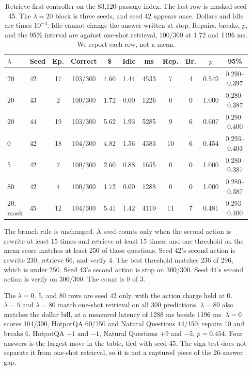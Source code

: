 \documentclass[letterpaper]{article} %
\begin{document}
\begin{table}[t]
\centering
\small
\setlength{\tabcolsep}{4pt}
\begin{tabular}{@{}llccccccccc@{}}
\toprule
\(\lambda\) & Seed & Ep. & Correct & \$ & Idle & ms & Rep. & Br. & \(p\) & 95\% \\
\midrule
20 & 42 & 17 & 103/300 & 4.60 & 1.44 & 4533 & 7 & 4 & 0.549 & 0.290--0.397 \\
20 & 43 & 2 & 100/300 & 1.72 & 0.00 & 1226 & 0 & 0 & 1.000 & 0.280--0.387 \\
20 & 44 & 19 & 103/300 & 5.62 & 1.93 & 5285 & 9 & 6 & 0.607 & 0.290--0.400 \\
0 & 42 & 18 & 104/300 & 4.82 & 1.56 & 4383 & 10 & 6 & 0.454 & 0.293--0.403 \\
5 & 42 & 7 & 100/300 & 2.60 & 0.88 & 1655 & 0 & 0 & 1.000 & 0.280--0.387 \\
80 & 42 & 4 & 100/300 & 1.72 & 0.00 & 1288 & 0 & 0 & 1.000 & 0.280--0.387 \\
\midrule
20, mask & 45 & 12 & 104/300 & 5.41 & 1.42 & 4110 & 11 & 7 & 0.481 & 0.293--0.400 \\
\bottomrule
\end{tabular}
\caption{Retrieve-first controller on the 83{,}120-passage index. The last row is masked seed 45. The \(\lambda{=}20\) block is three seeds, and seed 42 appears once. Dollars and Idle are times \(10^{-4}\). Idle cannot change the answer written at stop. Repairs, breaks, \(p\), and the 95\% interval are against one-shot retrieval, 100/300 at 1.72 and 1196 ms. We report each row, not a mean.}
\label{tab:rf}
\end{table}

The branch rule is unchanged. A seed counts only when the second action is rewrite at least 15 times and retrieve at least 15 times, and one threshold on the mean score matches at least 250 of those questions. Seed 42's second action is rewrite 230, retrieve 66, and verify 4. The best threshold matches 236 of 296, which is under 250. Seed 43's second action is stop on 300/300. Seed 44's second action is verify on 300/300. The count is 0 of 3.

The \(\lambda{=}0\), 5, and 80 rows are seed 42 only, with the action charge held at 0. \(\lambda{=}5\) and \(\lambda{=}80\) match one-shot retrieval on all 300 predictions. \(\lambda{=}80\) also matches the dollar bill, at a measured latency of 1288 ms beside 1196 ms. \(\lambda{=}0\) scores 104/300, HotpotQA 60/150 and Natural Questions 44/150, repairs 10 and breaks 6, HotpotQA \(+1\) and \(-1\), Natural Questions \(+9\) and \(-5\), \(p{=}0.454\). Four answers is the largest move in the table, tied with seed 45. The sign test does not separate it from one-shot retrieval, so it is not a captured piece of the 26-answer gap.
\end{document}
